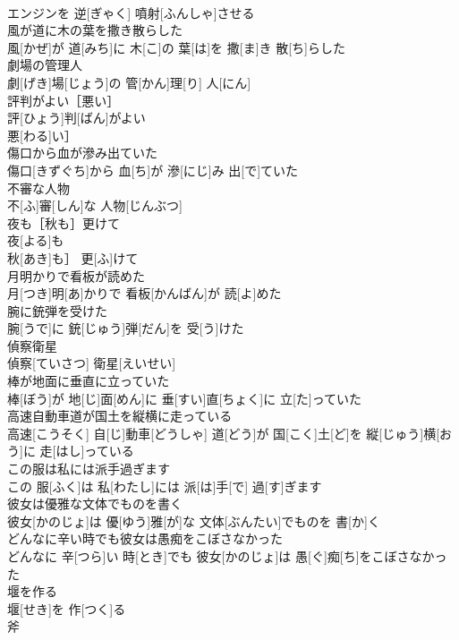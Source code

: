 \documentclass[8pt]{extreport}
\begin{document}
\begin{CJK}{UTF8}{min}
\\	エンジンを 逆[ぎゃく] 噴射[ふんしゃ]させる
\\	風が道に木の葉を撒き散らした	
\\	風[かぜ]が 道[みち]に 木[こ]の 葉[は]を 撒[ま]き 散[ち]らした
\\	劇場の管理人	
\\	劇[げき]場[じょう]の 管[かん]理[り] 人[にん]
\\	評判がよい［悪い］	
\\	評[ひょう]判[ばん]がよい
\\	悪[わる]い］
\\	傷口から血が滲み出ていた	
\\	傷口[きずぐち]から 血[ち]が 滲[にじ]み 出[で]ていた
\\	不審な人物	
\\	不[ふ]審[しん]な 人物[じんぶつ]
\\	夜も［秋も］更けて	
\\	夜[よる]も
\\	秋[あき]も］ 更[ふ]けて
\\	月明かりで看板が読めた	
\\	月[つき]明[あ]かりで 看板[かんばん]が 読[よ]めた
\\	腕に銃弾を受けた	
\\	腕[うで]に 銃[じゅう]弾[だん]を 受[う]けた
\\	偵察衛星	
\\	偵察[ていさつ] 衛星[えいせい]
\\	棒が地面に垂直に立っていた	
\\	棒[ぼう]が 地[じ]面[めん]に 垂[すい]直[ちょく]に 立[た]っていた
\\	高速自動車道が国土を縦横に走っている	
\\	高速[こうそく] 自[じ]動車[どうしゃ] 道[どう]が 国[こく]土[ど]を 縦[じゅう]横[おう]に 走[はし]っている
\\	この服は私には派手過ぎます	
\\	この 服[ふく]は 私[わたし]には 派[は]手[で] 過[す]ぎます
\\	彼女は優雅な文体でものを書く	
\\	彼女[かのじょ]は 優[ゆう]雅[が]な 文体[ぶんたい]でものを 書[か]く
\\	どんなに辛い時でも彼女は愚痴をこぼさなかった	
\\	どんなに 辛[つら]い 時[とき]でも 彼女[かのじょ]は 愚[ぐ]痴[ち]をこぼさなかった
\\	堰を作る	
\\	堰[せき]を 作[つく]る
\\	斧	

\end{CJK}
\end{document}
